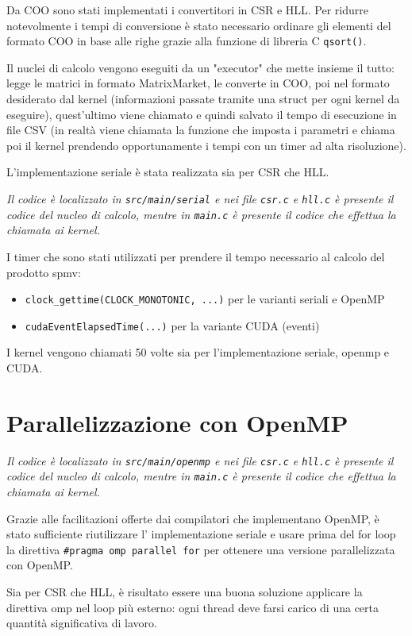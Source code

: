 \documentclass[a4paper,9pt]{extarticle}
\begin{document}
Da COO sono stati implementati i convertitori in CSR e HLL. Per ridurre notevolmente i tempi di conversione è stato
necessario ordinare gli elementi del formato COO in base alle righe grazie alla funzione di libreria C \texttt{qsort()}.

Il nuclei di calcolo vengono eseguiti da un "executor" che mette insieme il tutto: legge le matrici in formato
MatrixMarket, le converte in COO, poi nel formato desiderato dal kernel (informazioni passate tramite una struct per ogni 
kernel da eseguire), quest'ultimo viene chiamato e quindi salvato il tempo di esecuzione in file CSV (in realtà viene
chiamata la funzione che imposta i parametri e chiama poi il kernel prendendo opportunamente i tempi con un 
timer ad alta risoluzione).

L'implementazione seriale è stata realizzata sia per CSR che HLL.

\textit{Il codice è localizzato in \texttt{src/main/serial} e nei file \texttt{csr.c} e \texttt{hll.c} è presente il 
codice del nucleo di calcolo, mentre in \texttt{main.c} è presente il codice che effettua la chiamata ai kernel.}

I timer che sono stati utilizzati per prendere il tempo necessario al calcolo del prodotto spmv:
\begin{itemize}
	\item \texttt{clock\_gettime(CLOCK\_MONOTONIC, ...)} per le varianti seriali e OpenMP
	\item \texttt{cudaEventElapsedTime(...)} per la variante CUDA (eventi)
\end{itemize}

I kernel vengono chiamati 50 volte sia per l'implementazione seriale, openmp e CUDA.

\section{Parallelizzazione con OpenMP}
\textit{Il codice è localizzato in \texttt{src/main/openmp} e nei file \texttt{csr.c} e \texttt{hll.c} è presente il 
codice del nucleo di calcolo, mentre in \texttt{main.c} è presente il codice che effettua la chiamata ai kernel.}

Grazie alle facilitazioni offerte dai compilatori che implementano OpenMP, è stato sufficiente riutilizzare l'
implementazione seriale e usare prima del for loop la direttiva \texttt{\#pragma omp parallel for} per ottenere
una versione parallelizzata con OpenMP.

Sia per CSR che HLL, è risultato essere una buona soluzione applicare la direttiva omp nel loop più esterno: 
ogni thread deve farsi carico di una certa quantità significativa di lavoro.
\end{document}
